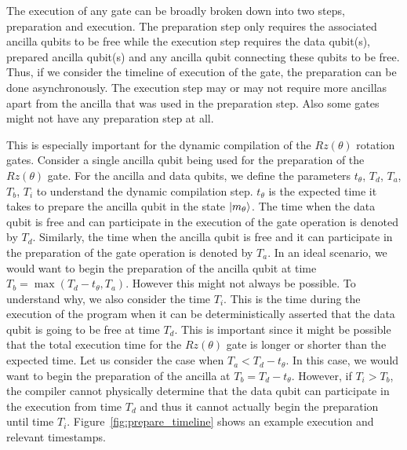 The execution of any gate can be broadly broken down into two steps, preparation and execution. The preparation step only requires the associated ancilla qubits to be free while the execution step requires the data qubit(s), prepared ancilla qubit(s) and any ancilla qubit connecting these qubits to be free. Thus, if we consider the timeline of execution of the gate, the preparation can be done asynchronously. The execution step may or may not require more ancillas apart from the ancilla that was used in the preparation step. Also some gates might not have any preparation step at all.\par
This is especially important for the dynamic compilation of the $Rz(\theta)$ rotation gates. Consider a single ancilla qubit being used for the preparation of the $Rz(\theta)$ gate. For the ancilla and data qubits, we define the parameters $t_\theta$, $T_d$, $T_a$, $T_b$, $T_i$ to understand the dynamic compilation step. $t_\theta$ is the expected time it takes to prepare the ancilla qubit in the state $\ket{m_\theta}$. The time when the data qubit is free and can participate in the execution of the gate operation is denoted by $T_d$. Similarly, the time when the ancilla qubit is free and it can participate in the preparation of the gate operation is denoted by $T_a$. In an ideal scenario, we would want to begin the preparation of the ancilla qubit at time $T_b = \max\left(T_d - t_\theta, T_a\right)$. However this might not always be possible. To understand why, we also consider the time $T_i$. This is the time during the execution of the program when it can be deterministically asserted that the data qubit is going to be free at time $T_d$. This is important since it might be possible that the total execution time for the $Rz(\theta)$ gate is longer or shorter than the expected time. Let us consider the case when $T_a < T_d - t_\theta$. In this case, we would want to begin the preparation of the ancilla at $T_b = T_d - t_\theta$. However, if $T_i > T_b$, the compiler cannot physically determine that the data qubit can participate in the execution from time $T_d$ and thus it cannot actually begin the preparation until time $T_i$. Figure~\ref{fig:prepare_timeline} shows an example execution and relevant timestamps.\par
